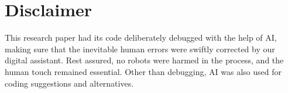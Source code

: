 \documentclass[
  12pt,
]{article}
\begin{document}
\section{Disclaimer}\label{disclaimer}

This research paper had its code deliberately debugged with the help of
AI, making sure that the inevitable human errors were swiftly corrected
by our digital assistant. Rest assured, no robots were harmed in the
process, and the human touch remained essential. Other than debugging,
AI was also used for coding suggestions and alternatives.
\end{document}

